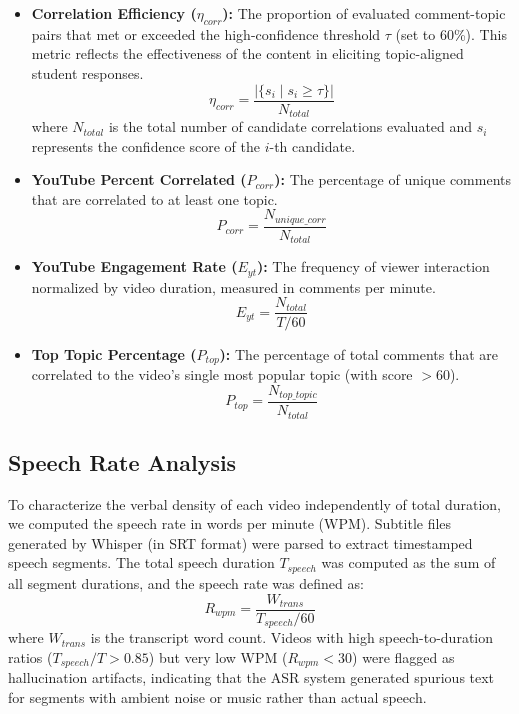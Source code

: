 \begin{itemize}
    \item \textbf{Correlation Efficiency ($\eta_{corr}$):} The proportion of evaluated comment-topic pairs that met or exceeded the high-confidence threshold $\tau$ (set to 60\%). This metric reflects the effectiveness of the content in eliciting topic-aligned student responses.
    \begin{equation}
        \eta_{corr} = \frac{|\{s_i \mid s_i \ge \tau\}|}{N_{total}}
    \end{equation}
    where $N_{total}$ is the total number of candidate correlations evaluated and $s_i$ represents the confidence score of the $i$-th candidate.

    \item \textbf{YouTube Percent Correlated ($P_{corr}$):} The percentage of unique comments that are correlated to at least one topic.
    \begin{equation}
        P_{corr} = \frac{N_{unique\_corr}}{N_{total}}
    \end{equation}

    \item \textbf{YouTube Engagement Rate ($E_{yt}$):} The frequency of viewer interaction normalized by video duration, measured in comments per minute.
    \begin{equation}
        E_{yt} = \frac{N_{total}}{T / 60}
    \end{equation}

    \item \textbf{Top Topic Percentage ($P_{top}$):} The percentage of total comments that are correlated to the video's single most popular topic (with score $> 60$).
    \begin{equation}
        P_{top} = \frac{N_{top\_topic}}{N_{total}}
    \end{equation}
\end{itemize}

\subsection{Speech Rate Analysis}

To characterize the verbal density of each video independently of total duration, we computed the speech rate in words per minute (WPM). Subtitle files generated by Whisper (in SRT format) were parsed to extract timestamped speech segments. The total speech duration $T_{speech}$ was computed as the sum of all segment durations, and the speech rate was defined as:
\begin{equation}
    R_{wpm} = \frac{W_{trans}}{T_{speech} / 60}
\end{equation}
where $W_{trans}$ is the transcript word count. Videos with high speech-to-duration ratios ($T_{speech} / T > 0.85$) but very low WPM ($R_{wpm} < 30$) were flagged as hallucination artifacts, indicating that the ASR system generated spurious text for segments with ambient noise or music rather than actual speech.

